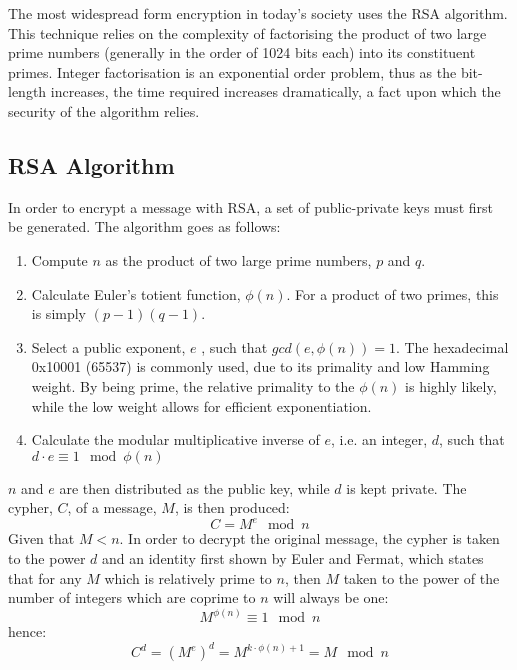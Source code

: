 \documentclass[a4paper,11pt,twocolumn]{article}
\begin{document}
	The most widespread form encryption in today’s society uses the RSA algorithm\cite{rivest1978method}. This technique relies on the complexity of factorising the product of two large prime numbers (generally in the order of 1024 bits each) into its constituent primes. Integer factorisation is an exponential order problem, thus as the bit-length increases, the time required increases dramatically, a fact upon which the security of the algorithm relies. 
	
	\subsection{RSA Algorithm}
	In order to encrypt a message with RSA, a set of public-private keys must first be generated. The algorithm goes as follows:
	\begin{enumerate}
		\item Compute $n$ as the product of two large prime numbers, $p$ and $q$.
		\item Calculate Euler's totient function\cite{euler2012theoremata}, $\phi\left( n\right)$. For a product of two primes, this is simply $\left(p - 1\right)\left(q - 1\right)$.
		\item Select a public exponent, $e$ , such that $gcd\left(e,\phi\left(n\right)\right) = 1$. The hexadecimal 0x10001 (65537) is commonly used, due to its primality and low Hamming weight. By being prime, the relative primality to the $\phi\left(n\right)$ is highly likely, while the low weight allows for efficient exponentiation.
		\item Calculate the modular multiplicative inverse of $e$, i.e. an integer, $d$, such that $d\cdot e \equiv 1 \mod \phi\left(n\right)$
	\end{enumerate}
	$n$ and $e$ are then distributed as the public key, while $d$ is kept private. The cypher, $C$, of a message, $M$, is then produced:
	\begin{equation}
	C = M^e \mod n
	\end{equation}
	Given that $M < n$. In order to decrypt the original message, the cypher is taken to the power $d$ and an identity first shown by Euler and Fermat\cite{hardy1979introduction}, which states that for any $M$ which is relatively prime to $n$, then $M$ taken to the power of the number of integers which are coprime to $n$ will always be one:
	\begin{equation}
	 M^{\phi\left(n\right)} \equiv 1 \mod n
	\end{equation}
	hence:
	\begin{equation}
	C^d = \left(M^e\right)^d = M^{k\cdot \phi\left(n\right) + 1} = M \mod n
	\end{equation}
	
\end{document}
